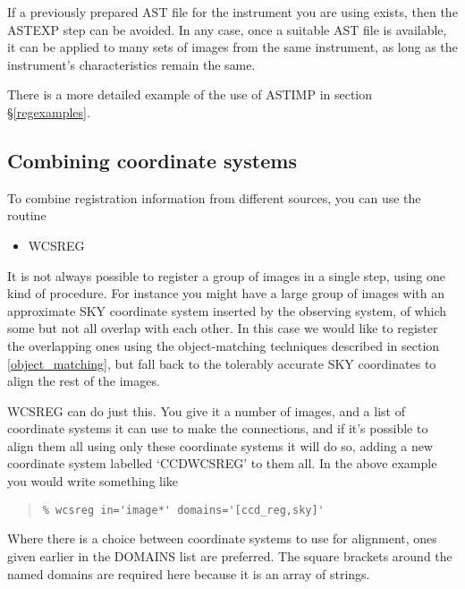 \documentclass[twoside,11pt]{article}
\newcommand{\htmlref}[2]{#1}
\newcommand{\latexhtml}[2]{#1}
\newcommand{\xlabel}[1]{}
\renewcommand{\_}{\texttt{\symbol{95}}}
\newcommand{\ttsize}{\latexhtml{\small}{}}
\newenvironment{myquote}{\begin{quote}\ttsize}{\end{quote}}
\newcommand{\routine}[1]{{\sc #1}}
\newcommand{\xroutine}[1]{\htmlref{{\sc #1}}{#1}}
\begin{document}
If a previously prepared AST file for the instrument you are using
exists, then the \routine{ASTEXP} step can be avoided.
In any case, once a suitable AST file is available, 
it can be applied to many sets of images from the same instrument,
as long as the instrument's characteristics remain the same.

There is a more detailed example of the use of \routine{ASTIMP} in 
section \S\ref{regexamples}.



\subsection{\xlabel{wcscombine}\label{wcscombine}Combining coordinate systems}

To combine registration information from different sources, you can
use the routine
\begin{itemize}
\item \xroutine{WCSREG}
\end{itemize}

It is not always possible to register a group of images in a single
step, using one kind of procedure.  For instance you might have
a large group of images with an approximate SKY coordinate system
inserted by the observing system, 
of which some but not all overlap with each other.
In this case we would like to register the overlapping ones
using the object-matching
techniques described in section \ref{object_matching},
but fall back to
the tolerably accurate SKY coordinates to align the rest of the images. 

\routine{WCSREG} can do just this.
You give it a number of images, and a list of coordinate systems
it can use to make the connections,
and if it's possible to align them all using only these coordinate
systems it will do so,
adding a new coordinate system labelled `CCD\_WCSREG' to them all.
In the above example you would write something like
\begin{myquote}
\begin{verbatim}
% wcsreg in='image*' domains='[ccd_reg,sky]'
\end{verbatim}
\end{myquote}
Where there is a choice between coordinate systems to use for alignment,
ones given earlier in the DOMAINS list are preferred.
The square brackets around the named domains are required here because it
is an array of strings.
\end{document}
